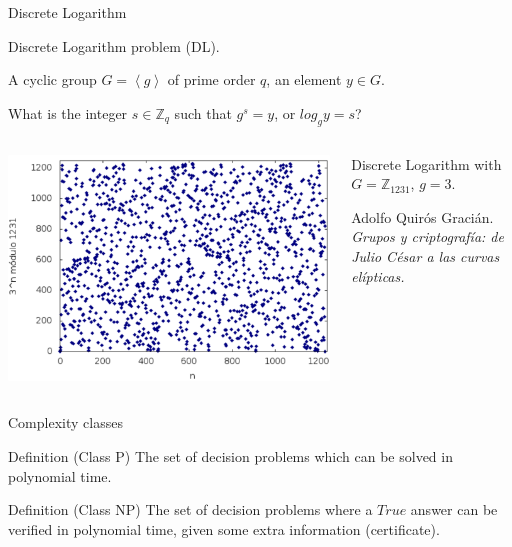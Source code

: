 \documentclass{beamer}
\begin{document}
\begin{frame}{Discrete Logarithm}

	\begin{description}[Parameters]
		\item[Name] Discrete Logarithm problem (DL).
		\item[Parameters] A cyclic group $G=\left\langle g \right\rangle$ of prime order $q$, an element $y\in G$.
		\item[Question] What is the integer  $s\in \mathbb{Z}_q$ such that $g^s = y$, or $log_g y = s$?
	\end{description}

	\begin{columns}

		\begin{column}{0.5\textwidth}
			\includegraphics[width=\linewidth]{DL}
		\end{column}
		\begin{column}{0.5\textwidth}
			Discrete Logarithm with $G=\mathbb{Z}_{1231}$, $g=3$.
			
			\small{Adolfo Quirós Gracián. \textit{Grupos y criptografía: de Julio César a las curvas elípticas.}}
		\end{column}
	
	\end{columns}


\end{frame}


\begin{frame}{Complexity classes}

\begin{block}{Definition (Class P)}
	The set of decision problems which can be solved in polynomial time.
\end{block}

\begin{block}{Definition (Class NP)}
	The set of decision problems where a $True$ answer can be verified in polynomial time, given some extra information (certificate).
\end{block}
	
\end{frame}
\end{document}
